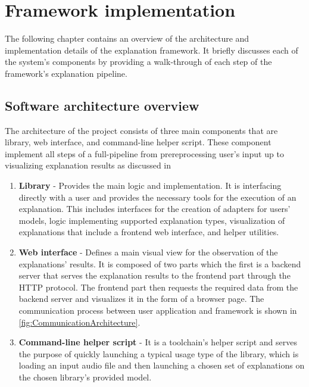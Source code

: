 \documentclass[
    bindingoffset=5mm,  %
    footnoteindent=3mm, %
    hyphenation=true    %
]{src/wut-thesis}
\begin{document}
\section{Framework implementation} \label{ch:implementation}

    The following chapter contains an overview of the architecture and implementation details of the explanation framework. It briefly discusses each of the system's components by providing
    a walk-through of each step of the framework's explanation pipeline.

\subsection{Software architecture overview}

    The architecture of the project consists of three main components that are library, web interface, and command-line helper script.
    These component implement all steps of a full-pipeline from prereprocessing
    user's input up to visualizing explanation results as discussed in

\begin{enumerate}
    \item \textbf{Library} - Provides the main logic and implementation. It is interfacing directly with a user and
    provides the necessary tools for the execution of an explanation. This includes interfaces for the creation of 
    adapters for users' models, logic implementing supported explanation types, visualization of explanations that 
    include a frontend web interface, and helper utilities.

    \item \textbf{Web interface} - Defines a main visual view for the observation of the explanations' results. It is
    composed of two parts which the first is a backend server that serves the explanation results to the frontend part
    through the HTTP protocol. The frontend part then requests the required data from the backend server and visualizes
    it in the form of a browser page. The communication process between user application and framework is shown in
    \ref{fig:CommunicationArchitecture}.

    \item \textbf{Command-line helper script} - It is a toolchain's helper script and serves the purpose of quickly 
    launching a typical usage type of the library, which is loading an input audio file and then launching a chosen set 
    of explanations on the chosen library's provided model.
\end{enumerate}
\end{document}
